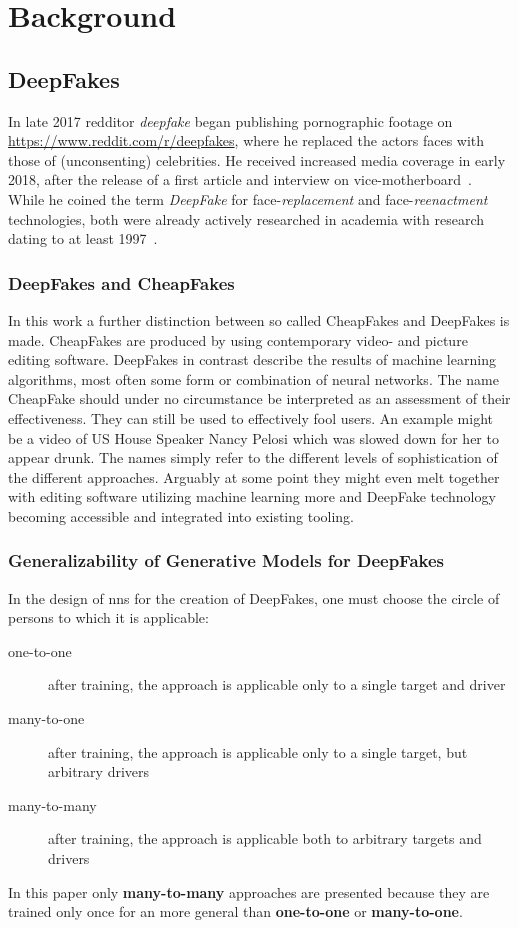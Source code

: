 \section{Background}\label{sect:background}
\subsection{DeepFakes}\label{subsect:deepfakes}
In late 2017 \gls{redditor} \textit{deepfake} began publishing pornographic footage
on \url{https://www.reddit.com/r/deepfakes}, where he replaced the actors faces
with those of (unconsenting) celebrities. He received increased media coverage
in early 2018, after the release of a first article and interview on
vice-motherboard~\cite{Cole.2017}. While he coined the term \textit{DeepFake}
for face-\textit{replacement} and face-\textit{reenactment} technologies, both
were already actively researched in academia with research dating to at least
1997~\cite{Bregler.1997}.

\subsubsection{DeepFakes and CheapFakes}
In this work a further distinction between so called CheapFakes and DeepFakes is
made. CheapFakes are produced by using contemporary video- and picture editing
software. DeepFakes in contrast describe the results of machine learning algorithms,
most often some form or combination of neural networks. The name CheapFake should
under no circumstance be interpreted as an assessment of their effectiveness.
They can still be used to effectively fool users. An example might be a video
of US House Speaker Nancy Pelosi which was slowed down for her to appear drunk.
The names simply refer to the different levels of sophistication of the different
approaches. Arguably at some point they might even melt together with editing software
utilizing machine learning more and DeepFake technology becoming accessible and
integrated into existing tooling.

\subsubsection{Generalizability of Generative Models for DeepFakes}
In the design of \glspl{nn} for the creation of DeepFakes, one must choose the
circle of persons to which it is applicable:
\begin{description}
    \item[one-to-one] after training, the approach is applicable only to a
    single target and driver
    \item[many-to-one] after training, the approach is applicable only to a
    single target, but arbitrary drivers
    \item[many-to-many] after training, the approach is applicable both to
    arbitrary targets and drivers
\end{description}\cite[cf.][]{Mirsky.2020}
In this paper only \textbf{many-to-many} approaches are presented because they
are trained only once for an more general than \textbf{one-to-one} or \textbf{many-to-one}.

